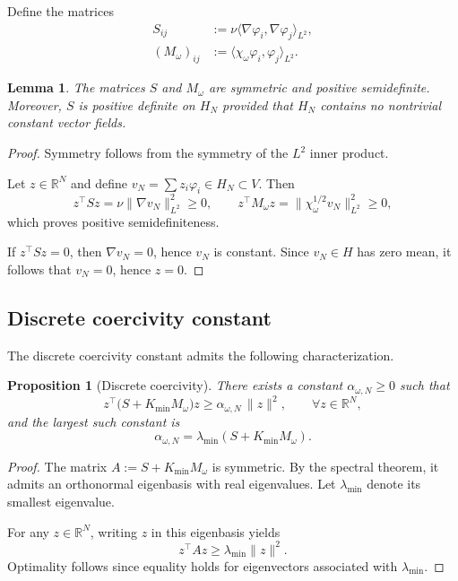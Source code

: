 \documentclass[preprint,12pt]{elsarticle}
\newtheorem{proposition}  [theorem]{Proposition}
\newtheorem{lemma}[theorem]{Lemma}
\begin{document}
Define the matrices
\begin{align}
S_{ij} &:= \nu \langle \nabla \varphi_i, \nabla \varphi_j\rangle_{L^2},\\
(M_\omega)_{ij} &:= \langle \chi_\omega \varphi_i, \varphi_j\rangle_{L^2}.
\end{align}

\begin{lemma}
The matrices $S$ and $M_\omega$ are symmetric and positive semidefinite.
Moreover, $S$ is positive definite on $H_N$ provided that $H_N$ contains no
nontrivial constant vector fields.
\end{lemma}

\begin{proof}
Symmetry follows from the symmetry of the $L^2$ inner product.

Let $z\in\mathbb{R}^N$ and define $v_N=\sum z_i\varphi_i \in H_N\subset V$.
Then
\[
z^\top S z = \nu \|\nabla v_N\|_{L^2}^2 \ge 0,
\qquad
z^\top M_\omega z = \|\chi_\omega^{1/2} v_N\|_{L^2}^2 \ge 0,
\]
which proves positive semidefiniteness.

If $z^\top S z=0$, then $\nabla v_N=0$, hence $v_N$ is constant.
Since $v_N\in H$ has zero mean, it follows that $v_N=0$, hence $z=0$.
\end{proof}

\subsection{Discrete coercivity constant}
The discrete coercivity constant admits the following characterization.
\begin{proposition}[Discrete coercivity]
\label{prop:discrete_coercivity}
There exists a constant $\alpha_{\omega,N}\ge 0$ such that
\begin{equation}
\label{eq:coercivity_discrete}
z^\top\big(S + K_{\min} M_\omega\big) z \ge
\alpha_{\omega,N}\, \|z\|^2,
\qquad \forall z\in\mathbb{R}^N,
\end{equation}
and the largest such constant is
\[
\alpha_{\omega,N} = \lambda_{\min}(S + K_{\min}M_\omega).
\]
\end{proposition}

\begin{proof}
The matrix $A:=S+K_{\min}M_\omega$ is symmetric.
By the spectral theorem, it admits an orthonormal eigenbasis with real eigenvalues.
Let $\lambda_{\min}$ denote its smallest eigenvalue.

For any $z\in\mathbb{R}^N$, writing $z$ in this eigenbasis yields
\[
z^\top A z \ge \lambda_{\min} \|z\|^2.
\]
Optimality follows since equality holds for eigenvectors associated with
$\lambda_{\min}$.
\end{proof}
\end{document}
